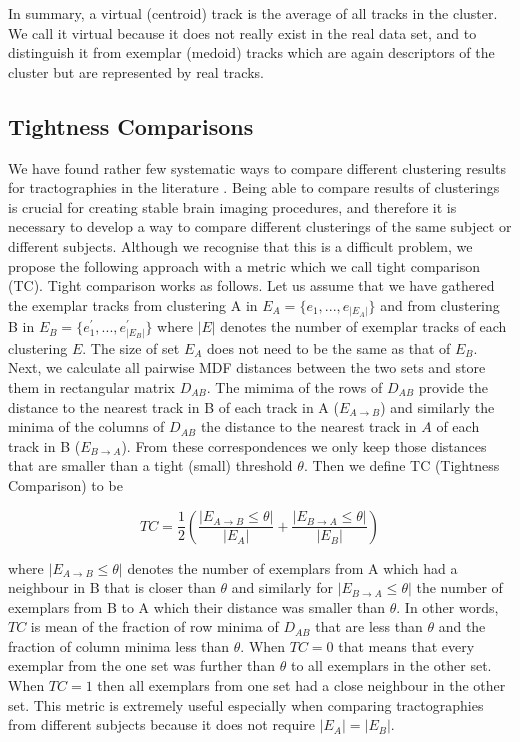 \documentclass[preprint,authoryear,a4paper,10pt,onecolumn]{elsarticle}
\begin{document}
In summary, a virtual (centroid) track is the average of all tracks in
the cluster. We call it virtual because it does not really exist in the
real data set, and to distinguish it from exemplar (medoid) tracks which
are again descriptors of the cluster but are represented by real tracks.

\subsection{Tightness Comparisons\label{sub:Tightness-comparisons-1}}

We have found rather few systematic ways to compare different clustering
results for tractographies in the literature
\citep{moberts2005evaluation}.  Being able to compare results of
clusterings is crucial for creating stable brain imaging procedures, and
therefore it is necessary to develop a way to compare different
clusterings of the same subject or different subjects. Although we
recognise that this is a difficult problem, we propose the following
approach with a metric which we call tight comparison (TC). Tight
comparison works as follows. Let us assume that we have gathered the
exemplar tracks from clustering A in $E_{A}=\{e_{1},...,e_{|E_{A}|}\}$
and from clustering B in $E_{B}=\{e_{1}^{'},...,e_{|E_{B}|}^{'}\}$ where
$|E|$ denotes the number of exemplar tracks of each clustering $E$. The
size of set $E_{A}$ does not need to be the same as that of
$E_{B}$. Next, we calculate all pairwise MDF distances between the two
sets and store them in rectangular matrix $D_{AB}$. The mimima of the
rows of $D_{AB}$ provide the distance to the nearest track in B of each
track in A ($E_{A\rightarrow B}$) and similarly the minima of the
columns of $D_{AB}$ the distance to the nearest track in $A$ of each
track in B ($E_{B\rightarrow A}$). From these correspondences we only
keep those distances that are smaller than a tight (small) threshold
$\theta$. Then we define TC (Tightness Comparison) to be

\begin{equation}
TC=\frac{1}{2}\left(\frac{|E_{A\rightarrow B}\leq \theta |}{|E_{A}|}+\frac{|E_{B\rightarrow A}\leq \theta |}{|E_{B}|}\right)\label{eq:TC}
\end{equation}

\noindent where $|E_{A\rightarrow B}\leq \theta |$ denotes the number of
exemplars from A which had a neighbour in B that is closer than $\theta$
and similarly for $|E_{B\rightarrow A}\leq \theta |$ the number of
exemplars from B to A which their distance was smaller than
$\theta$. In other words, $TC$ is mean of the fraction of row minima of
$D_{AB}$ that are less than $\theta$ and the fraction of column minima
less than $\theta$.  When $TC=0$ that means that every exemplar from the
one set was further than $\theta$ to all exemplars in the other
set. When $TC=1$ then all exemplars from one set had a close neighbour
in the other set. This metric is extremely useful especially when
comparing tractographies from different subjects because it does not
require $|E_{A}|=|E_{B}|$.
\end{document}
